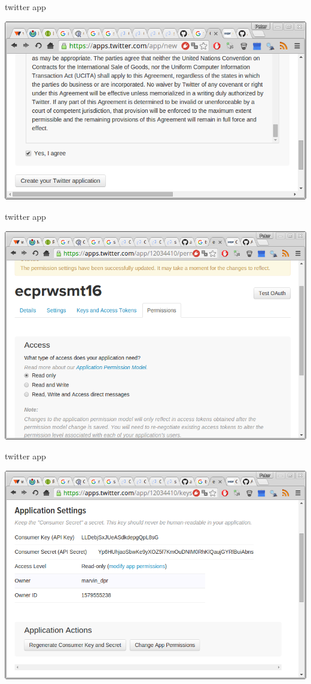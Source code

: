\documentclass[ignorenonframetext,]{beamer}
\begin{document}
\begin{frame}{twitter app}

\includegraphics{fig/twitterapp4.png}

\end{frame}

\begin{frame}{twitter app}

\includegraphics{fig/twitterapp5.png}

\end{frame}

\begin{frame}{twitter app}

\includegraphics{fig/twitterapp6.png}

\end{frame}
\end{document}
